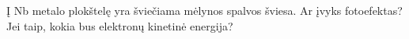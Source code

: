 \question Į Nb metalo plokštelę yra šviečiama mėlynos spalvos šviesa. Ar įvyks fotoefektas? Jei taip, kokia bus elektronų kinetinė energija?